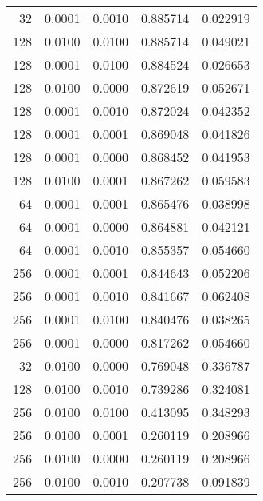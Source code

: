 \begin{tabular}{rrrrr}
  32 &  0.0001 &  0.0010 &  0.885714 &  0.022919 \\
 128 &  0.0100 &  0.0100 &  0.885714 &  0.049021 \\
 128 &  0.0001 &  0.0100 &  0.884524 &  0.026653 \\
 128 &  0.0100 &  0.0000 &  0.872619 &  0.052671 \\
 128 &  0.0001 &  0.0010 &  0.872024 &  0.042352 \\
 128 &  0.0001 &  0.0001 &  0.869048 &  0.041826 \\
 128 &  0.0001 &  0.0000 &  0.868452 &  0.041953 \\
 128 &  0.0100 &  0.0001 &  0.867262 &  0.059583 \\
  64 &  0.0001 &  0.0001 &  0.865476 &  0.038998 \\
  64 &  0.0001 &  0.0000 &  0.864881 &  0.042121 \\
  64 &  0.0001 &  0.0010 &  0.855357 &  0.054660 \\
 256 &  0.0001 &  0.0001 &  0.844643 &  0.052206 \\
 256 &  0.0001 &  0.0010 &  0.841667 &  0.062408 \\
 256 &  0.0001 &  0.0100 &  0.840476 &  0.038265 \\
 256 &  0.0001 &  0.0000 &  0.817262 &  0.054660 \\
  32 &  0.0100 &  0.0000 &  0.769048 &  0.336787 \\
 128 &  0.0100 &  0.0010 &  0.739286 &  0.324081 \\
 256 &  0.0100 &  0.0100 &  0.413095 &  0.348293 \\
 256 &  0.0100 &  0.0001 &  0.260119 &  0.208966 \\
 256 &  0.0100 &  0.0000 &  0.260119 &  0.208966 \\
 256 &  0.0100 &  0.0010 &  0.207738 &  0.091839 \\
\bottomrule
\end{tabular}
